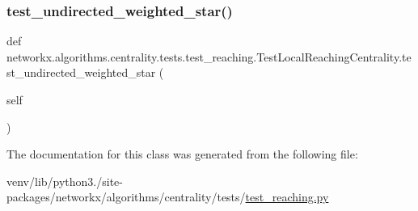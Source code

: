 \subsubsection{\texorpdfstring{test\+\_\+undirected\+\_\+weighted\+\_\+star()}{test\_undirected\_weighted\_star()}}
{\footnotesize\ttfamily def networkx.\+algorithms.\+centrality.\+tests.\+test\+\_\+reaching.\+Test\+Local\+Reaching\+Centrality.\+test\+\_\+undirected\+\_\+weighted\+\_\+star (\begin{DoxyParamCaption}\item[{}]{self }\end{DoxyParamCaption})}



The documentation for this class was generated from the following file\+:\begin{DoxyCompactItemize}
\item 
venv/lib/python3./site-\/packages/networkx/algorithms/centrality/tests/\hyperlink{test__reaching_8py}{test\+\_\+reaching.\+py}\end{DoxyCompactItemize}
